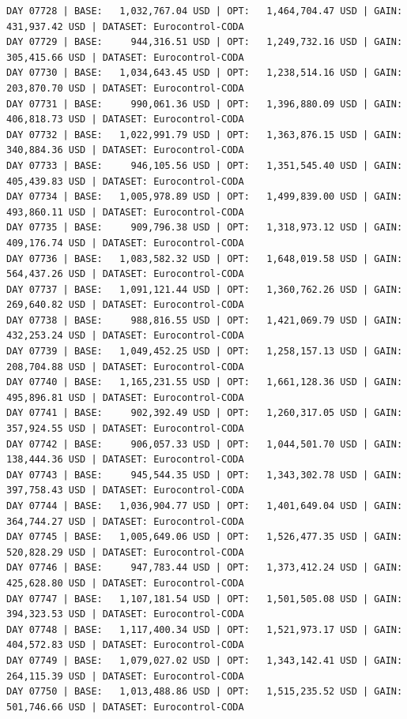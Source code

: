 \documentclass[11pt,a4paper]{article}
\begin{document}
\begin{verbatim}
DAY 07728 | BASE:   1,032,767.04 USD | OPT:   1,464,704.47 USD | GAIN: 431,937.42 USD | DATASET: Eurocontrol-CODA
DAY 07729 | BASE:     944,316.51 USD | OPT:   1,249,732.16 USD | GAIN: 305,415.66 USD | DATASET: Eurocontrol-CODA
DAY 07730 | BASE:   1,034,643.45 USD | OPT:   1,238,514.16 USD | GAIN: 203,870.70 USD | DATASET: Eurocontrol-CODA
DAY 07731 | BASE:     990,061.36 USD | OPT:   1,396,880.09 USD | GAIN: 406,818.73 USD | DATASET: Eurocontrol-CODA
DAY 07732 | BASE:   1,022,991.79 USD | OPT:   1,363,876.15 USD | GAIN: 340,884.36 USD | DATASET: Eurocontrol-CODA
DAY 07733 | BASE:     946,105.56 USD | OPT:   1,351,545.40 USD | GAIN: 405,439.83 USD | DATASET: Eurocontrol-CODA
DAY 07734 | BASE:   1,005,978.89 USD | OPT:   1,499,839.00 USD | GAIN: 493,860.11 USD | DATASET: Eurocontrol-CODA
DAY 07735 | BASE:     909,796.38 USD | OPT:   1,318,973.12 USD | GAIN: 409,176.74 USD | DATASET: Eurocontrol-CODA
DAY 07736 | BASE:   1,083,582.32 USD | OPT:   1,648,019.58 USD | GAIN: 564,437.26 USD | DATASET: Eurocontrol-CODA
DAY 07737 | BASE:   1,091,121.44 USD | OPT:   1,360,762.26 USD | GAIN: 269,640.82 USD | DATASET: Eurocontrol-CODA
DAY 07738 | BASE:     988,816.55 USD | OPT:   1,421,069.79 USD | GAIN: 432,253.24 USD | DATASET: Eurocontrol-CODA
DAY 07739 | BASE:   1,049,452.25 USD | OPT:   1,258,157.13 USD | GAIN: 208,704.88 USD | DATASET: Eurocontrol-CODA
DAY 07740 | BASE:   1,165,231.55 USD | OPT:   1,661,128.36 USD | GAIN: 495,896.81 USD | DATASET: Eurocontrol-CODA
DAY 07741 | BASE:     902,392.49 USD | OPT:   1,260,317.05 USD | GAIN: 357,924.55 USD | DATASET: Eurocontrol-CODA
DAY 07742 | BASE:     906,057.33 USD | OPT:   1,044,501.70 USD | GAIN: 138,444.36 USD | DATASET: Eurocontrol-CODA
DAY 07743 | BASE:     945,544.35 USD | OPT:   1,343,302.78 USD | GAIN: 397,758.43 USD | DATASET: Eurocontrol-CODA
DAY 07744 | BASE:   1,036,904.77 USD | OPT:   1,401,649.04 USD | GAIN: 364,744.27 USD | DATASET: Eurocontrol-CODA
DAY 07745 | BASE:   1,005,649.06 USD | OPT:   1,526,477.35 USD | GAIN: 520,828.29 USD | DATASET: Eurocontrol-CODA
DAY 07746 | BASE:     947,783.44 USD | OPT:   1,373,412.24 USD | GAIN: 425,628.80 USD | DATASET: Eurocontrol-CODA
DAY 07747 | BASE:   1,107,181.54 USD | OPT:   1,501,505.08 USD | GAIN: 394,323.53 USD | DATASET: Eurocontrol-CODA
DAY 07748 | BASE:   1,117,400.34 USD | OPT:   1,521,973.17 USD | GAIN: 404,572.83 USD | DATASET: Eurocontrol-CODA
DAY 07749 | BASE:   1,079,027.02 USD | OPT:   1,343,142.41 USD | GAIN: 264,115.39 USD | DATASET: Eurocontrol-CODA
DAY 07750 | BASE:   1,013,488.86 USD | OPT:   1,515,235.52 USD | GAIN: 501,746.66 USD | DATASET: Eurocontrol-CODA

\end{verbatim}
\end{document}
